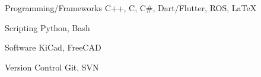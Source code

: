 

\begin{cvskills}

  \cvskill
    {Programming/Frameworks} %
    {C++, C, C\#, Dart/Flutter, ROS, LaTeX} %

  \cvskill
    {Scripting} %
    {Python, Bash} %

  \cvskill
    {Software} %
    {KiCad, FreeCAD} %

  \cvskill
    {Version Control} %
    {Git, SVN} %

\end{cvskills}

